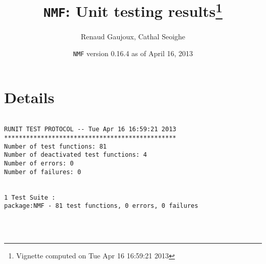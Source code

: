 \documentclass[10pt]{article}
\author{Renaud Gaujoux, Cathal Seoighe}
\title{\texttt{NMF}: Unit testing results\footnote{Vignette computed  on Tue Apr 16 16:59:21 2013}}
\date{\texttt{NMF} version 0.16.4 as of April 16, 2013}
\begin{document}
\maketitle

\section{Details}
\begin{verbatim}

RUNIT TEST PROTOCOL -- Tue Apr 16 16:59:21 2013 
*********************************************** 
Number of test functions: 81 
Number of deactivated test functions: 4 
Number of errors: 0 
Number of failures: 0 

 
1 Test Suite : 
package:NMF - 81 test functions, 0 errors, 0 failures




\end{verbatim}
\end{document}
